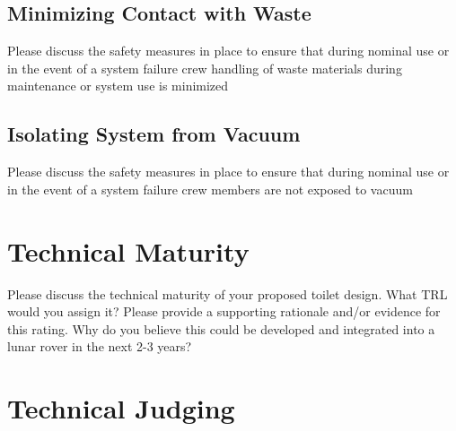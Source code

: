     \subsection{Minimizing Contact with Waste}
    Please discuss the safety measures in place to ensure that during nominal use or in the event of a system failure crew handling of waste materials during maintenance or system use is minimized

    \subsection{Isolating System from Vacuum}
    Please discuss the safety measures in place to ensure that during nominal use or in the event of a system failure crew members are not exposed to vacuum

\pagebreak
\section{Technical Maturity}
    Please discuss the technical maturity of your proposed toilet design. What TRL would you assign it? Please provide a supporting rationale and/or evidence for this rating. Why do you believe this could be developed and integrated into a lunar rover in the next 2-3 years?

\pagebreak
\section{Technical Judging}

\begin{table}[h]
\end{table}
